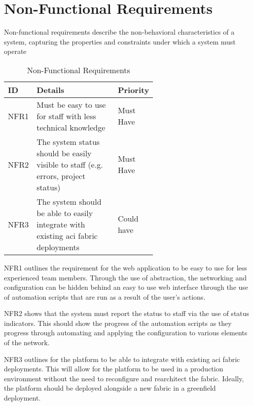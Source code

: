 \section{Non-Functional Requirements}
Non-functional requirements describe the non-behavioral characteristics of a system, capturing the properties and constraints under which a system must operate \citep{12} 
\begin{center}
    \begin{table}[H]
        \begin{tabular}{l p{0.6\linewidth} l}
            \hline
            \textbf{ID}             & \textbf{Details}
                                    & \textbf{Priority}
            \\ \hline
            NFR1                    & Must be easy to use for staff with less technical
            knowledge
                                    & Must Have
            \\ \hline
            NFR2                    & The system status should be easily visible to staff (e.g.
            errors, project status) & Must Have                                                                                       \\ \hline
            NFR3                    & The system should be able to easily integrate with existing \gls{aci} fabric deployments & Could have
        \end{tabular}
        \caption{Non-Functional Requirements}
        \label{requirements:non-functional}
    \end{table}
\end{center}

NFR1 outlines the requirement for the web application to be easy to use for less experienced team members. Through the use of abstraction, the networking and configuration can be hidden behind an easy to use web interface through the use of automation scripts that are run as a result of the user's actions.

NFR2 shows that the system must report the status to staff via the use of status indicators. This should show the progress of the automation scripts as they progress through automating and applying the configuration to various elements of the network.

NFR3 outlines for the platform to be able to integrate with existing \gls{aci} fabric deployments. This will allow for the platform to be used in a production environment without the need to reconfigure and rearchitect the fabric. Ideally, the platform should be deployed alongside a new fabric in a greenfield deployment.